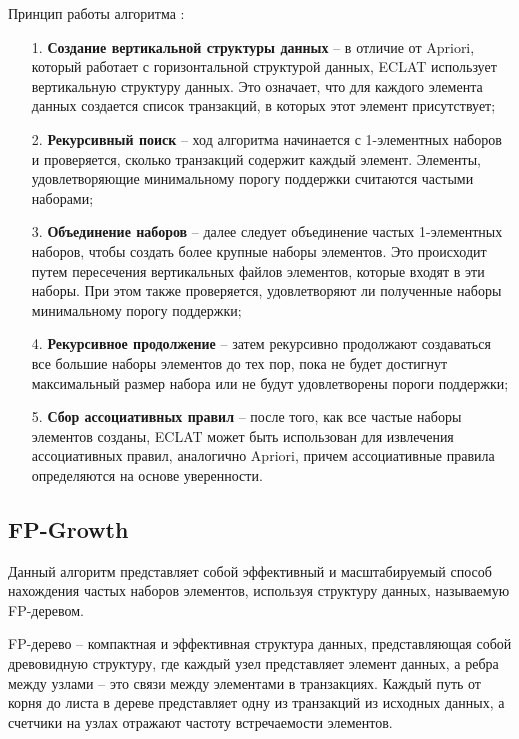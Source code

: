 Принцип работы алгоритма \cite{sr1}:
\begin{enumerate}
	\item[1.] \textbf{Создание вертикальной структуры данных} -- в отличие от Apriori, который работает с горизонтальной структурой данных, ECLAT использует вертикальную структуру данных. Это означает, что для каждого элемента данных создается список транзакций, в которых этот элемент присутствует;
	\item[2.] \textbf{Рекурсивный поиск} -- ход алгоритма начинается с 1-элементных наборов и проверяется, сколько транзакций содержит каждый элемент. Элементы, удовлетворяющие минимальному порогу поддержки считаются частыми наборами;
	\item[3.] \textbf{Объединение наборов} -- далее следует объединение частых 1-элементных наборов, чтобы создать более крупные наборы элементов. Это происходит путем пересечения вертикальных файлов элементов, которые входят в эти наборы. При этом также проверяется, удовлетворяют ли полученные наборы минимальному порогу поддержки;
	\item[4.] \textbf{Рекурсивное продолжение} -- затем рекурсивно продолжают создаваться все большие наборы элементов до тех пор, пока не будет достигнут максимальный размер набора или не будут удовлетворены пороги поддержки;
	\item[5.] \textbf{Сбор ассоциативных правил} -- после того, как все частые наборы элементов созданы, ECLAT может быть использован для извлечения ассоциативных правил, аналогично Apriori, причем ассоциативные правила определяются на основе уверенности.
\end{enumerate}

\subsection{FP-Growth}

Данный алгоритм представляет собой эффективный и масштабируемый способ нахождения частых наборов элементов, используя структуру данных, называемую FP-деревом.

FP-дерево -- компактная и эффективная структура данных, представляющая собой древовидную структуру, где каждый узел представляет элемент данных, а ребра между узлами -- это связи между элементами в транзакциях. Каждый путь от корня до листа в дереве представляет одну из транзакций из исходных данных, а счетчики на узлах отражают частоту встречаемости элементов. \cite{fpgrowth}

